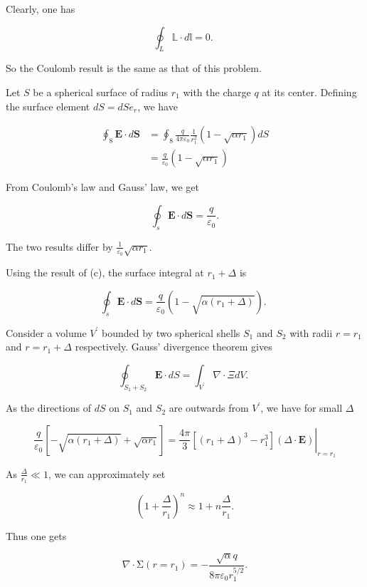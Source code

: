 \documentclass[10pt]{article}
\begin{document}
Clearly, one has

$$
\oint_{L} \mathbb{L} \cdot d \mathbb{l}=0 \text {. }
$$

So the Coulomb result is the same as that of this problem.

 Let $S$ be a spherical surface of radius $r_{1}$ with the charge $q$ at its center. Defining the surface element $d S=d S e_{r}$, we have

$$
\begin{aligned}
\oint_{8} \mathbf{E} \cdot d \mathbf{S} &=\oint_{8} \frac{q}{4 \pi \varepsilon_{0}} \frac{1}{r_{1}^{2}}\left(1-\sqrt{\alpha r_{1}}\right) d S \\
&=\frac{q}{\varepsilon_{0}}\left(1-\sqrt{\alpha r_{1}}\right)
\end{aligned}
$$

From Coulomb's law and Gauss' law, we get

$$
\oint_{s} \mathbf{E} \cdot d \mathbf{S}=\frac{q}{\varepsilon_{0}} .
$$

The two results differ by $\frac{1}{\varepsilon_{0}} \sqrt{\alpha r_{1}}$.

 Using the result of (c), the surface integral at $r_{1}+\Delta$ is

$$
\oint_{s} \mathbf{E} \cdot d \mathbf{S}=\frac{q}{\varepsilon_{0}}\left(1-\sqrt{\alpha\left(r_{1}+\Delta\right)}\right) \text {. }
$$

Consider a volume $V^{\prime}$ bounded by two spherical shells $S_{1}$ and $S_{2}$ with radii $r=r_{1}$ and $r=r_{1}+\Delta$ respectively. Gauss' divergence theorem gives

$$
\oint_{S_{1}+S_{2}} \mathbf{E} \cdot d S=\int_{V^{\prime}} \nabla \cdot \mathbb{\Xi} d V \text {. }
$$

As the directions of $d S$ on $S_{1}$ and $S_{2}$ are outwards from $V^{\prime}$, we have for small $\Delta$

$$
\frac{q}{\varepsilon_{0}}\left[-\sqrt{\alpha\left(r_{1}+\Delta\right)}+\sqrt{\alpha r_{1}}\right]=\left.\frac{4 \pi}{3}\left[\left(r_{1}+\Delta\right)^{3}-r_{1}^{3}\right](\Delta \cdot \mathbf{E})\right|_{r=r_{1}}
$$

As $\frac{\Delta}{r_{1}} \ll 1$, we can approximately set

$$
\left(1+\frac{\Delta}{r_{1}}\right)^{n} \approx 1+n \frac{\Delta}{r_{1}} .
$$

Thus one gets

$$
\nabla \cdot \mathrm{\Sigma}\left(r=r_{1}\right)=-\frac{\sqrt{\alpha} q}{8 \pi \varepsilon_{0} r_{1}^{5 / 2}} .
$$
\end{document}
